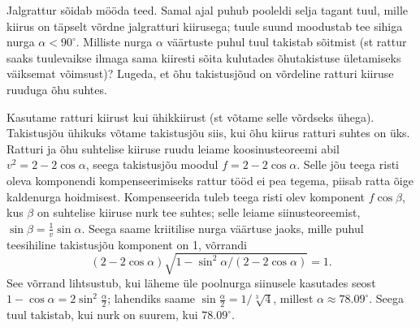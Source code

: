 
Jalgrattur sõidab mööda teed.  Samal ajal puhub pooleldi selja tagant tuul, mille kiirus on täpselt võrdne jalgratturi kiirusega; tuule suund moodustab tee sihiga nurga $\alpha<90^\circ$. Milliste nurga $\alpha$ väärtuste puhul tuul takistab sõitmist (st rattur saaks tuulevaikse ilmaga sama kiiresti sõita kulutades õhutakistuse ületamiseks väiksemat võimsust)? Lugeda, et õhu takistusjõud on võrdeline ratturi kiiruse ruuduga õhu suhtes.


\hint

\solu
Kasutame ratturi kiirust kui ühikkiirust (st võtame selle võrdseks ühega). Takistusjõu ühikuks võtame takistusjõu siis, kui õhu kiirus ratturi suhtes on üks. Ratturi ja õhu suhtelise kiiruse ruudu leiame koosinusteoreemi abil $v^2=2-2\cos\alpha$, seega takistusjõu moodul  $f=2-2\cos\alpha$. Selle jõu teega risti oleva komponendi kompenseerimiseks rattur tööd ei pea tegema, piisab ratta õige kaldenurga hoidmisest. Kompenseerida tuleb teega risti olev komponent $f\cos\beta$, kus $\beta$ on suhtelise kiiruse nurk tee suhtes; selle leiame siinusteoreemist, $\sin\beta=\frac 1v\sin\alpha$. Seega saame kriitilise nurga väärtuse jaoks, mille puhul teesihiline takistusjõu komponent on 1, võrrandi
$$(2-2\cos\alpha)\sqrt{1-\sin^2\alpha/(2-2\cos\alpha)}=1.$$
See võrrand lihtsustub, kui läheme üle poolnurga siinusele kasutades seost $1-\cos\alpha=2\sin^2\frac\alpha 2$; lahendiks saame  $\sin\frac\alpha 2= 1/\sqrt[3]4$, millest $\alpha\approx 78.09^\circ$. Seega tuul takistab, kui nurk on suurem, kui $78.09^\circ$.
\probend